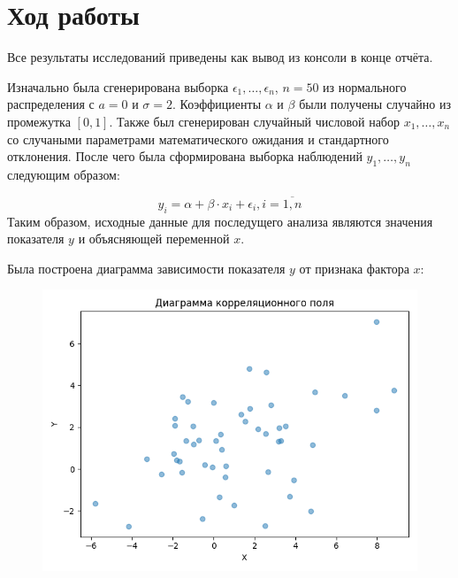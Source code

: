 \section{Ход работы}

Все результаты исследований приведены как вывод из консоли в конце отчёта.

Изначально была сгенерирована выборка $\epsilon_1, \ldots, \epsilon_n$, $n = 50$ из нормального распределения с $a = 0$ и $\sigma = 2$. Коэффициенты $\alpha$ и $\beta$ были получены случайно из промежутка $[0,1]$. Также был сгенерирован случайный числовой набор $x_1, \ldots, x_n$ со случаными параметрами математического ожидания и стандартного отклонения. После чего была сформирована выборка наблюдений $y_1, \ldots, y_n$ следующим образом:

\begin{equation}
	y_i = \alpha + \beta \cdot x_i + \epsilon_i, i = \overline{1, n}
\end{equation}
Таким образом, исходные данные для последущего анализа являются значения показателя $y$ и объясняющей переменной $x$.

Была построена диаграмма зависимости показателя $y$ от признака фактора $x$:

\begin{figure}[H]
	\begin{minipage}[H]{\linewidth}
		\begin{center}
			\includegraphics[width=\linewidth]{figures/cor_field}
		\end{center}
	\end{minipage}
\end{figure}

